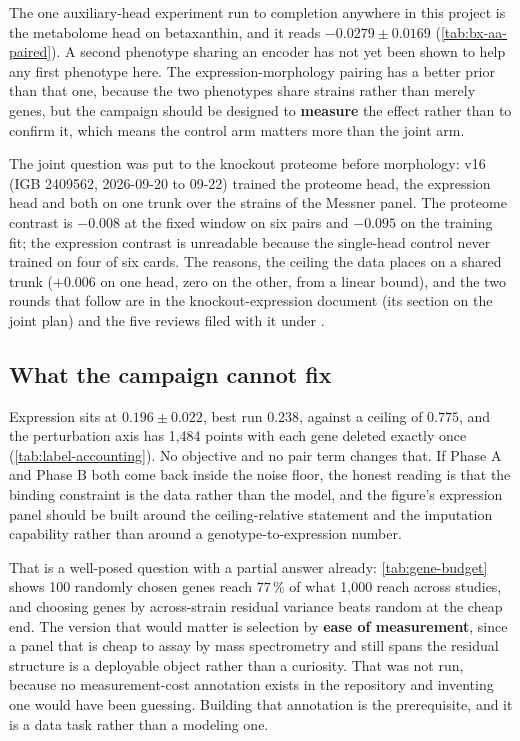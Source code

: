  The one auxiliary-head experiment run to completion anywhere in this project is the
metabolome head on betaxanthin, and it reads $-0.0279 \pm 0.0169$
(\cref{tab:bx-aa-paired}). A second phenotype sharing an encoder has not yet been shown to
help any first phenotype here. The expression-morphology pairing has a better prior than
that one, because the two phenotypes share strains rather than merely genes, but the
campaign should be designed to \textbf{measure} the effect rather than to confirm it, which
means the control arm matters more than the joint arm.

 The joint question was
put to the knockout proteome before morphology: v16 (IGB 2409562, 2026-09-20 to 09-22) trained
the proteome head, the expression head and both on one trunk over the strains of the Messner
panel. The proteome contrast is $-0.008$ at the fixed window on six pairs and $-0.095$ on the
training fit; the expression contrast is unreadable because the single-head control never
trained on four of six cards. The reasons, the ceiling the data places on a shared trunk
($+0.006$ on one head, zero on the other, from a linear bound), and the two rounds that follow
are in the knockout-expression document (its section on the joint plan) and the five reviews
filed with it under .

\subsection{What the campaign cannot fix}

Expression sits at $0.196 \pm 0.022$, best run $0.238$, against a ceiling of $0.775$, and
the perturbation axis has 1,484
points with each gene deleted exactly once (\cref{tab:label-accounting}). No objective and
no pair term changes that. If Phase A and Phase B both come back inside the noise floor,
the honest reading is that the binding constraint is the data rather than the model, and
the figure's expression panel should be built around the ceiling-relative statement and the
imputation capability rather than around a genotype-to-expression number.

 That is a well-posed question with a partial answer already:
\cref{tab:gene-budget} shows 100 randomly chosen genes reach $77\,\%$ of what 1,000 reach
across studies, and choosing genes by across-strain residual variance beats random at the
cheap end. The version that would matter is selection by \textbf{ease of measurement}, since
a panel that is cheap to assay by mass spectrometry and still spans the residual structure is
a deployable object rather than a curiosity. That was not run, because no measurement-cost
annotation exists in the repository and inventing one would have been guessing. Building that
annotation is the prerequisite, and it is a data task rather than a modeling one.
